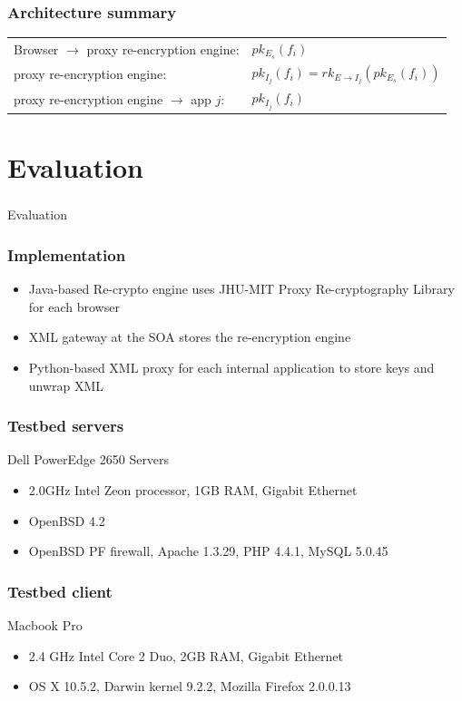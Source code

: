 \documentclass{beamer}
\begin{document}
\begin{frame}
\frametitle{Architecture summary}
\begin{tabular}{ll}
Browser $\to$ proxy re-encryption engine: & $pk_{E_s}(f_i)$ \\
proxy re-encryption engine: & $pk_{I_j}(f_i) = rk_{E \to I_j}(pk_{E_s}(f_i))$ \\
proxy re-encryption engine $\to$ app $j$: & $pk_{I_j}(f_i)$ \\
\end{tabular}
\end{frame}

\section{Evaluation}
\begin{frame}
\frametitle{}
\begin{center}
Evaluation
\end{center}
\end{frame}

\begin{frame}
\frametitle{Implementation}
\begin{itemize}
\item Java-based Re-crypto engine uses JHU-MIT Proxy Re-cryptography Library
for each browser 
\item XML gateway at the SOA stores the re-encryption engine 
\item Python-based XML proxy for each internal application to store keys and
unwrap XML
\end{itemize}
\end{frame}

\begin{frame}
\frametitle{Testbed servers}
Dell PowerEdge 2650 Servers
\begin{itemize}
\item 2.0GHz Intel Zeon processor, 1GB RAM, Gigabit Ethernet
\item OpenBSD 4.2
\item OpenBSD PF firewall, Apache 1.3.29, PHP 4.4.1, MySQL 5.0.45 
\end{itemize}
\end{frame}

\begin{frame}
\frametitle{Testbed client}
Macbook Pro
\begin{itemize}
\item 2.4 GHz Intel Core 2 Duo, 2GB RAM, Gigabit Ethernet
\item OS X 10.5.2, Darwin kernel 9.2.2, Mozilla Firefox 2.0.0.13
\end{itemize}
\end{frame}
\end{document}

